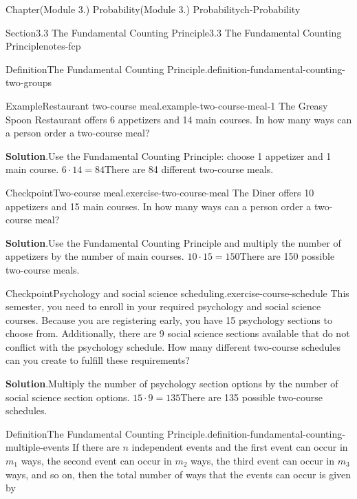\documentclass[oneside,10pt,]{book}
\newcommand{\blocktitlefont}{\relax}
\begin{document}
\begin{chapterptx}{Chapter}{(Module 3.) Probability}{}{(Module 3.) Probability}{}{}{ch-Probability}
\begin{sectionptx}{Section}{3.3 The Fundamental Counting Principle}{}{3.3 The Fundamental Counting Principle}{}{}{notes-fcp}
\begin{definition}{Definition}{The Fundamental Counting Principle.}{definition-fundamental-counting-two-groups}
\end{definition}
\begin{example}{Example}{Restaurant two-course meal.}{example-two-course-meal-1}%
The Greasy Spoon Restaurant offers 6 appetizers and 14 main courses. In how many ways can a person order a two-course meal?%
\par\smallskip%
\noindent\textbf{\blocktitlefont Solution}.\hypertarget{example-two-course-meal-1-3}{}\quad{}Use the Fundamental Counting Principle: choose 1 appetizer and 1 main course.%
\(6 \cdot 14 = 84\)There are 84 different two-course meals.%
\end{example}
\begin{inlineexercise}{Checkpoint}{Two-course meal.}{exercise-two-course-meal}%
The Diner offers 10 appetizers and 15 main courses. In how many ways can a person order a two-course meal?%
\par\smallskip%
\noindent\textbf{\blocktitlefont Solution}.\hypertarget{exercise-two-course-meal-3}{}\quad{}Use the Fundamental Counting Principle and multiply the number of appetizers by the number of main courses.%
\(10 \cdot 15 = 150\)There are 150 possible two-course meals.%
\end{inlineexercise}%
\begin{inlineexercise}{Checkpoint}{Psychology and social science scheduling.}{exercise-course-schedule}%
This semester, you need to enroll in your required psychology and social science courses. Because you are registering early, you have 15 psychology sections to choose from. Additionally, there are 9 social science sections available that do not conflict with the psychology schedule. How many different two-course schedules can you create to fulfill these requirements?%
\par\smallskip%
\noindent\textbf{\blocktitlefont Solution}.\hypertarget{exercise-course-schedule-3}{}\quad{}Multiply the number of psychology section options by the number of social science section options.%
\(15 \cdot 9 = 135\)There are 135 possible two-course schedules.%
\end{inlineexercise}%
\begin{definition}{Definition}{The Fundamental Counting Principle.}{definition-fundamental-counting-multiple-events}%
If there are \(n\) independent events and the first event can occur in \(m_1\) ways, the second event can occur in \(m_2\) ways, the third event can occur in \(m_3\) ways, and so on, then the total number of ways that the events can occur is given by%
%
\begin{equation*}

\end{equation*}
\end{definition}
\end{sectionptx}
\end{chapterptx}
\end{document}
